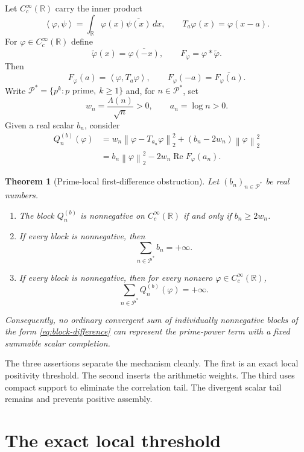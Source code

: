 \documentclass[11pt,a4paper]{amsart}
\newcommand{\R}{\mathbb{R}}
\newcommand{\PP}{\mathcal{P}^{\!*}}
\newcommand{\ip}[2]{\left\langle #1,#2\right\rangle}
\newcommand{\norm}[1]{\left\lVert #1\right\rVert_{2}}
\theoremstyle{plain}
\newtheorem{theorem}{Theorem}[section]
\theoremstyle{definition}
\begin{document}
Let $C_c^\infty(\R)$ carry the inner product
\[
 \ip{\varphi}{\psi}=\int_{\R}\varphi(x)\overline{\psi(x)}\,dx,
 \qquad T_a\varphi(x)=\varphi(x-a).
\]
For $\varphi\in C_c^\infty(\R)$ define
\[
 \widetilde\varphi(x)=\overline{\varphi(-x)},
 \qquad F_\varphi=\varphi*\widetilde\varphi.
\]
Then
\begin{equation}\label{eq:correlation}
 F_\varphi(a)=\ip{\varphi}{T_a\varphi},
 \qquad F_\varphi(-a)=\overline{F_\varphi(a)}.
\end{equation}
Write $\PP=\{p^k:p\text{ prime},\ k\geq1\}$ and, for $n\in\PP$, set
\[
 w_n=\frac{\Lambda(n)}{\sqrt n}>0,
 \qquad a_n=\log n>0.
\]
Given a real scalar $b_n$, consider
\begin{align}
 Q_n^{(b)}(\varphi)
 &=w_n\norm{\varphi-T_{a_n}\varphi}^{2}
   +(b_n-2w_n)\norm{\varphi}^{2} \label{eq:block-difference}\\
 &=b_n\norm{\varphi}^{2}
   -2w_n\operatorname{Re}F_\varphi(a_n). \label{eq:block-correlation}
\end{align}

\begin{theorem}[Prime-local first-difference obstruction]\label{thm:main}
Let $(b_n)_{n\in\PP}$ be real numbers.
\begin{enumerate}
\item The block $Q_n^{(b)}$ is nonnegative on $C_c^\infty(\R)$ if and only if
      $b_n\geq2w_n$.
\item If every block is nonnegative, then
      \[
      \sum_{n\in\PP}b_n=+\infty.
      \]
\item If every block is nonnegative, then for every nonzero
      $\varphi\in C_c^\infty(\R)$,
      \[
      \sum_{n\in\PP}Q_n^{(b)}(\varphi)=+\infty.
      \]
\end{enumerate}
Consequently, no ordinary convergent sum of individually nonnegative blocks
of the form \eqref{eq:block-difference} can represent the prime-power term
with a fixed summable scalar completion.
\end{theorem}

The three assertions separate the mechanism cleanly.  The first is an exact
local positivity threshold.  The second inserts the arithmetic weights.  The
third uses compact support to eliminate the correlation tail.  The divergent
scalar tail remains and prevents positive assembly.

\section{The exact local threshold}
\end{document}
